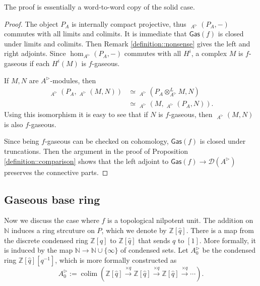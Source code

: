\documentclass{article}
\theoremstyle{plain}
\theoremstyle{definition}
\theoremstyle{remark}
\DeclareMathOperator{\colim}{colim}
\DeclareMathOperator{\rhoms}{\underline{RHom}}
\newcommand{\dten}{\otimes ^{L}}
\newcommand{\huflag}{\triangleright}
\newcommand{\D}{\mathcal{D}}
\begin{document}
The proof is essentially a word-to-word copy of the solid case.

\begin{proof}
The object $ P _{A} $ is internally compact projective, thus $ \rhoms _{A ^{\huflag}}(P _{A}, -) $ commutes with all limits and colimits.
It is immediate that $ \mathsf{Gas}(f) $ is closed under limits and colimits.
Then Remark \ref{definition::nonsense} gives the left and right adjoints.
Since $ \hom _{A ^{\huflag}}(P _{A}, -) $ commutes with all $ H ^{i} $, a complex $ M $ is $ f $-gaseous if each $ H ^{i}(M) $ is $ f $-gaseous.

If $ M,N $ are $ A ^{\huflag} $-modules, then
\begin{align*}
\rhoms _{A ^{\huflag}}(P _{A}, \rhoms _{A ^{\huflag}}(M, N))
&\simeq \rhoms _{A ^{\huflag}}(P _{A}\dten _{A ^{\huflag}} M, N)\\
&\simeq \rhoms _{A ^{\huflag}}(M, \rhoms _{A ^{\huflag}}(P _{A}, N)).
\end{align*}
Using this isomorphism it is easy to see that if $ N $ is $ f $-gaseous,
then $ \rhoms _{A ^{\huflag}}(M, N) $ is also $ f $-gaseous.

Since being $ f $-gaseous can be checked on cohomology, $ \mathsf{Gas}(f) $ is closed under truncations.
Then the argument in the proof of Proposition \ref{definition::comparison} shows that
the left adjoint to $ \mathsf{Gas}(f)\to \D (A ^{\huflag}) $ preserves the connective parts.
\end{proof}

\subsection{Gaseous base ring}

Now we discuss the case where $ f $ is a topological nilpotent unit.
The addition on $ \mathbb{N} $ induces a ring strcuture on $ P $,
which we denote by $ \mathbb{Z}[\hat{q}] $.
There is a map from the discrete condensed ring $ \mathbb{Z}[q] $ to $ \mathbb{Z}[\hat{q}] $
that sends $ q $ to $ [1] $.
More formally, it is induced by the map $ \mathbb{N}\to \mathbb{N}\cup \{\infty\} $ of condensed sets.
Let $ A _{0}^{\huflag} $ be the condensed ring $ \mathbb{Z}[\hat{q}][q ^{-1}]$,
which is more formally constructed as
\begin{equation*}
A _{0}^{\huflag} := \colim (\mathbb{Z}[\hat{q}] \xrightarrow{\times q} \mathbb{Z}[\hat{q}]\xrightarrow{\times q} \mathbb{Z}[\hat{q}]\xrightarrow{\times q} \cdots   ).
\end{equation*}
\end{document}

